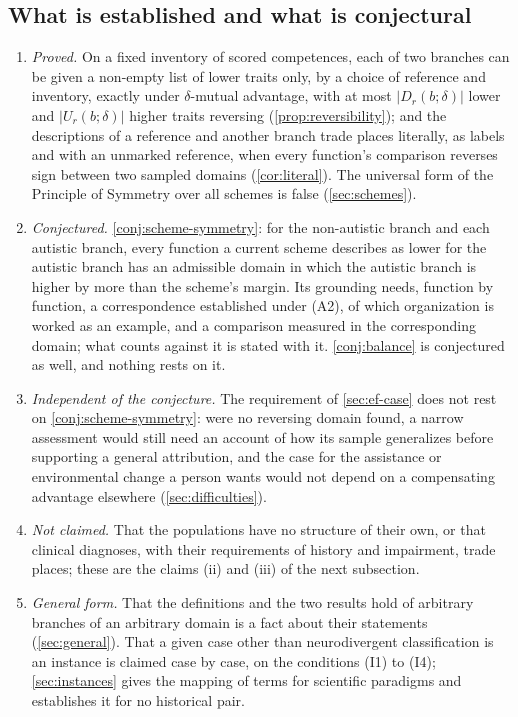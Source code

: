 \subsection{What is established and what is conjectural}
\label{sec:established}

\begin{enumerate}[label=(\roman*), leftmargin=*, nosep]
\item \emph{Proved.} On a fixed inventory of scored competences, each of two branches can be given a non-empty list of lower traits only, by a choice of reference and inventory, exactly under $\delta$-mutual advantage, with at most $|D_r(b;\delta)|$ lower and $|U_r(b;\delta)|$ higher traits reversing (\autoref{prop:reversibility}); and the descriptions of a reference and another branch trade places literally, as labels and with an unmarked reference, when every function's comparison reverses sign between two sampled domains (\autoref{cor:literal}). The universal form of the Principle of Symmetry over all schemes is false (\autoref{sec:schemes}).
\item \emph{Conjectured.} \autoref{conj:scheme-symmetry}: for the non-autistic branch and each autistic branch, every function a current scheme describes as lower for the autistic branch has an admissible domain in which the autistic branch is higher by more than the scheme's margin. Its grounding needs, function by function, a correspondence established under (A2), of which organization is worked as an example, and a comparison measured in the corresponding domain; what counts against it is stated with it. \autoref{conj:balance} is conjectured as well, and nothing rests on it.
\item \emph{Independent of the conjecture.} The requirement of \autoref{sec:ef-case} does not rest on \autoref{conj:scheme-symmetry}: were no reversing domain found, a narrow assessment would still need an account of how its sample generalizes before supporting a general attribution, and the case for the assistance or environmental change a person wants would not depend on a compensating advantage elsewhere (\autoref{sec:difficulties}).
\item \emph{Not claimed.} That the populations have no structure of their own, or that clinical diagnoses, with their requirements of history and impairment, trade places; these are the claims (ii) and (iii) of the next subsection.
\item \emph{General form.} That the definitions and the two results hold of arbitrary branches of an arbitrary domain is a fact about their statements (\autoref{sec:general}). That a given case other than neurodivergent classification is an instance is claimed case by case, on the conditions (I1) to (I4); \autoref{sec:instances} gives the mapping of terms for scientific paradigms and establishes it for no historical pair.
\end{enumerate}

